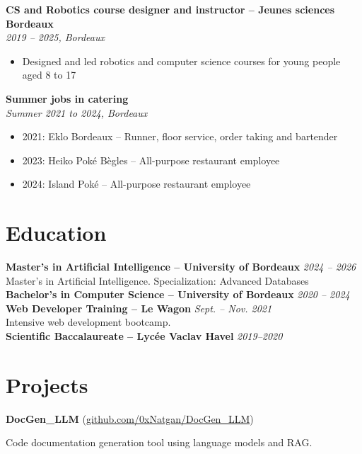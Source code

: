 \documentclass[a4paper,10pt]{article}
\begin{document}
\noindent\textbf{CS and Robotics course designer and instructor -- Jeunes sciences Bordeaux}\\ \hfill \textit{2019 -- 2025, Bordeaux}
\begin{itemize}
    \item Designed and led robotics and computer science courses for young people aged 8 to 17
\end{itemize}

\noindent\textbf{Summer jobs in catering}\\ \hfill \textit{Summer 2021 to 2024, Bordeaux}
\begin{itemize}
    \item 2021: Eklo Bordeaux -- Runner, floor service, order taking and bartender
    \item 2023: Heiko Poké Bègles -- All-purpose restaurant employee
    \item 2024: Island Poké -- All-purpose restaurant employee
\end{itemize}

\section*{Education}
\noindent\textbf{Master's in Artificial Intelligence -- University of Bordeaux} \hfill \textit{2024 -- 2026}\\
\indent Master's in Artificial Intelligence. Specialization: Advanced Databases\\

\noindent\textbf{Bachelor's in Computer Science -- University of Bordeaux} \hfill \textit{2020 -- 2024}\\

\noindent\textbf{Web Developer Training -- Le Wagon} \hfill \textit{Sept. -- Nov. 2021}\\
\indent Intensive web development bootcamp.\\

\noindent\textbf{Scientific Baccalaureate -- Lycée Vaclav Havel} \hfill \textit{2019--2020}\\


\section*{Projects}
\noindent\textbf{DocGen\_LLM} (\href{https://github.com/0xNatgan/DocGen_LLM}{github.com/0xNatgan/DocGen\_LLM})

\indent Code documentation generation tool using language models and RAG.\\
\end{document}
